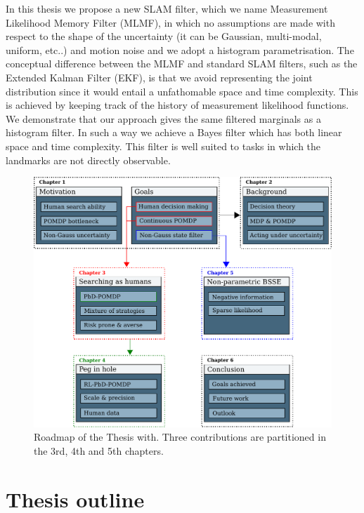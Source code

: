In this thesis we propose a new SLAM filter, which we name Measurement Likelihood Memory Filter (MLMF), in 
which no assumptions are made with respect to the shape of the uncertainty (it can be Gaussian, multi-modal, uniform, etc..) and 
motion noise and we adopt a histogram parametrisation. The conceptual difference between the MLMF and standard SLAM filters, 
such as the Extended Kalman Filter (EKF), is that we avoid representing the joint distribution since it would entail a unfathomable 
space and time complexity. 
This is achieved by keeping track of the history of measurement likelihood functions. We demonstrate that our approach gives 
the same filtered marginals as a histogram filter. In such a way we achieve a Bayes filter which has both linear space and 
time complexity. This filter is well suited to tasks in which the landmarks are not directly observable.


\begin{figure}
  \centering
  \includegraphics[width=\textwidth]{./ch1-Introduction/Figures/roadmap.pdf}
  \caption{Roadmap of the Thesis with. Three contributions are partitioned in the 3rd, 4th and 5th chapters.}
  \label{fig:rmap_thesis}
\end{figure}

\section{Thesis outline}

